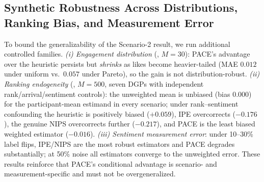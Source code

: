 \documentclass[journal]{IEEEtran}
\begin{document}
\subsection{Synthetic Robustness Across Distributions, Ranking Bias, and Measurement Error}
To bound the generalizability of the Scenario-2 result, we run additional controlled families. \emph{(i) Engagement distribution} (, $M = 30$): PACE's advantage over the heuristic persists but \emph{shrinks} as likes become heavier-tailed (MAE $0.012$ under uniform vs.\ $0.057$ under Pareto), so the gain is not distribution-robust. \emph{(ii) Ranking endogeneity} (, $M = 500$, seven DGPs with independent rank/arrival/sentiment controls): the unweighted mean is unbiased (bias $0.000$) for the participant-mean estimand in every scenario; under rank--sentiment confounding the heuristic is positively biased ($+0.059$), IPE overcorrects ($-0.176$), the genuine NIPS overcorrects further ($-0.217$), and PACE is the least biased weighted estimator ($-0.016$). \emph{(iii) Sentiment measurement error}: under 10--30\% label flips, IPE/NIPS are the most robust estimators and PACE degrades substantially; at 50\% noise all estimators converge to the unweighted error. These results reinforce that PACE's conditional advantage is scenario- and measurement-specific and must not be overgeneralized.
\end{document}
